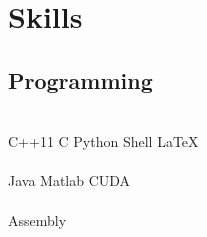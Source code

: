 \documentclass[letterpaper]{deedy-resume} %
\begin{document}
\begin{minipage}[t]{0.32\textwidth}
\sectionspace %


\section{Skills}

\subsection{Programming}

 \\
C++11 \textbullet{} C \textbullet{} Python \textbullet{} Shell \textbullet{} \LaTeX\ \\
 \\
Java \textbullet{} Matlab \textbullet{} CUDA \\
 \\
Assembly

\sectionspace %


\end{minipage} %
\hfill
%
%
\end{document}
